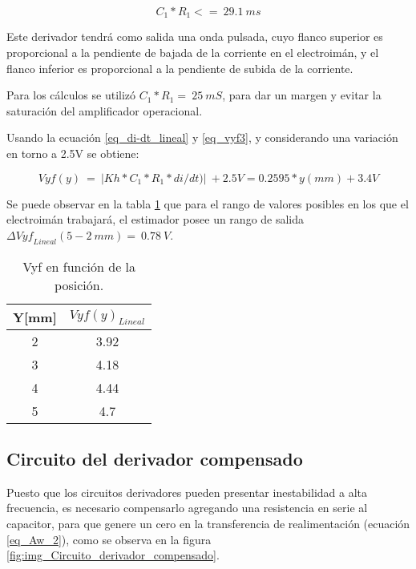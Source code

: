 \begin{equation} \label{eq_condicionC1-R1-2}
	C_1*R_1<=\ 29.1\ ms
\end{equation}

\noindent Este derivador tendr\'{a} como salida una onda pulsada, cuyo flanco superior  es proporcional a la pendiente de bajada de la corriente en el electroim\'{a}n, y el flanco inferior es proporcional a la pendiente de subida de la corriente. 

\noindent Para los c\'{a}lculos se utiliz\'{o} $C_1*R_1=\ 25\ mS$, para dar un margen y evitar la saturaci\'{o}n del amplificador operacional.  

\noindent Usando la ecuaci\'{o}n \ref{eq_di-dt_lineal} y \ref{eq_vyf3}, y considerando una variaci\'{o}n en torno a 2.5V se obtiene:

\noindent

\begin{equation} \label{eq_Vyf-lineal}
	Vyf(y)\ =\ |Kh*C_1*R_1*di/dt)|\ +2.5V=0.2595*y(mm)+3.4V
\end{equation}

\noindent Se puede observar en la tabla \ref{tab_Vyf_vs_y} que para el rango de valores posibles en los que el electroim\'{a}n trabajar\'{a}, el estimador posee un rango de salida ${\mathit{\Delta}{Vyf}_{Lineal}}(5-2\ mm)=\ 0.78\ V$.

\begin{table}[H]
	\begin{center}
		\begin{tabular}{| c | c |}
			\hline
			Y[mm] & ${Vyf(y)}_{Lineal}$\\ \hline
			2 & 3.92 \\ \hline 
			3 & 4.18 \\ \hline 
			4 & 4.44 \\ \hline 
			5 & 4.7 \\ \hline 
		\end{tabular}
		\caption{Vyf en función de la posición.}
		\label{tab_Vyf_vs_y}
	\end{center}
\end{table}

\subsection{Circuito del derivador compensado}

\noindent Puesto que los circuitos derivadores pueden presentar inestabilidad a alta frecuencia, es necesario compensarlo agregando una resistencia en serie al capacitor, para que genere un cero en la transferencia de realimentaci\'{o}n (ecuación \ref{eq_Aw_2}), como se observa en la figura  \ref{fig:img_Circuito_derivador_compensado}.

